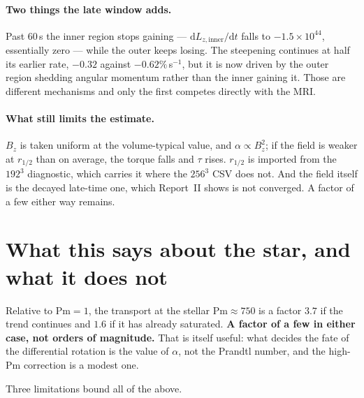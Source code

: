 \documentclass[11pt,a4paper]{article}
\newcommand{\Pm}{\mathrm{Pm}}
\begin{document}
\paragraph{Two things the late window adds.} Past $60$\,s the inner region stops
gaining --- $\mathrm{d}L_{z,\mathrm{inner}}/\mathrm{d}t$ falls to
$-1.5\times10^{44}$, essentially zero --- while the outer keeps losing. The
steepening continues at half its earlier rate, $-0.32$ against
$-0.62\%$\,s$^{-1}$, but it is now driven by the outer region shedding angular
momentum rather than the inner gaining it. Those are different mechanisms and
only the first competes directly with the MRI.

\paragraph{What still limits the estimate.} $B_z$ is taken uniform at the
volume-typical value, and $\alpha \propto B_z^2$; if the field is weaker at
$r_{1/2}$ than on average, the torque falls and $\tau$ rises. $r_{1/2}$ is
imported from the $192^3$ diagnostic, which carries it where the $256^3$ CSV
does not. And the field itself is the decayed late-time one, which Report~II
shows is not converged. A factor of a few either way remains.

\section{What this says about the star, and what it does not}

Relative to $\Pm = 1$, the transport at the stellar $\Pm \approx 750$ is a
factor $3.7$ if the trend continues and $1.6$ if it has already saturated.
\textbf{A factor of a few in either case, not orders of magnitude.} That is
itself useful: what decides the fate of the differential rotation is the value
of $\alpha$, not the Prandtl number, and the high-$\Pm$ correction is a modest
one.

Three limitations bound all of the above.
\end{document}
